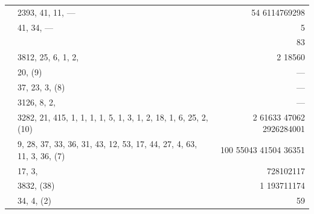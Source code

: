 \documentclass[11pt]{article}
\begin{document}
{\begin{longtable}{|r|p{8.5cm}|r|}
       & 2393, 41, 11, --- & 54 6114769298 \\
       & 41, 34, --- & 5 \\
       & & 83 \\
       & 3812, 25, 6, 1, 2, & 2 18560 \\
       & 20, (9) & --- \\
       & 37, 23, 3, (8) & --- \\
       & 3126, 8, 2, & --- \\
       & 3282, 21, 415, 1, 1, 1, 1, 5, 1, 3, 1, 2, 18, 1, 6, 25, 2, (10) & 2 61633 47062 2926284001 \\
       & 9, 28, 37, 33, 36, 31, 43, 12, 53, 17, 44, 27, 4, 63, 11, 3, 36, (7) & 100 55043 41504 36351 \\
       & 17, 3, & 728102117 \\
       & 3832, (38) & 1 193711174 \\
       & 34, 4, (2) & 59 \\
\hline
\end{longtable}
}
\end{document}
